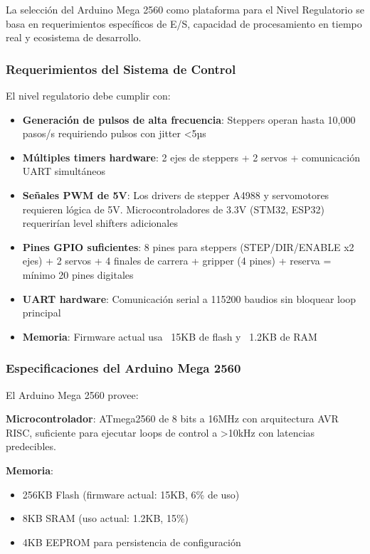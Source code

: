 La selección del Arduino Mega 2560 como plataforma para el Nivel Regulatorio se basa en requerimientos específicos de E/S, capacidad de procesamiento en tiempo real y ecosistema de desarrollo.

\subsubsection{Requerimientos del Sistema de Control}

El nivel regulatorio debe cumplir con:

\begin{itemize}
    \item \textbf{Generación de pulsos de alta frecuencia}: Steppers operan hasta 10,000 pasos/s requiriendo pulsos con jitter <5µs
    \item \textbf{Múltiples timers hardware}: 2 ejes de steppers + 2 servos + comunicación UART simultáneos
    \item \textbf{Señales PWM de 5V}: Los drivers de stepper A4988 y servomotores requieren lógica de 5V. Microcontroladores de 3.3V (STM32, ESP32) requerirían level shifters adicionales
    \item \textbf{Pines GPIO suficientes}: 8 pines para steppers (STEP/DIR/ENABLE x2 ejes) + 2 servos + 4 finales de carrera + gripper (4 pines) + reserva = mínimo 20 pines digitales
    \item \textbf{UART hardware}: Comunicación serial a 115200 baudios sin bloquear loop principal
    \item \textbf{Memoria}: Firmware actual usa ~15KB de flash y ~1.2KB de RAM
\end{itemize}

\subsubsection{Especificaciones del Arduino Mega 2560}

El Arduino Mega 2560 provee:

\textbf{Microcontrolador}: ATmega2560 de 8 bits a 16MHz con arquitectura AVR RISC, suficiente para ejecutar loops de control a >10kHz con latencias predecibles.

\textbf{Memoria}:
\begin{itemize}
    \item 256KB Flash (firmware actual: 15KB, 6\% de uso)
    \item 8KB SRAM (uso actual: 1.2KB, 15\%)
    \item 4KB EEPROM para persistencia de configuración
\end{itemize}

